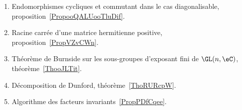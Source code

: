 
	\label{THEMEooPolynomeEndomorphismes}
\begin{enumerate}
	\item Endomorphismes cycliques et commutant dans le cas diagonalisable, proposition~\ref{PropooQALUooTluDif}.
	\item Racine carrée d'une matrice hermitienne positive, proposition~\ref{PropVZvCWn}.
	\item Théorème de Burnside sur les sous-groupes d'exposant fini de \( \GL(n,\eC)\), théorème~\ref{ThooJLTit}.
	\item Décomposition de Dunford, théorème~\ref{ThoRURcpW}.
	\item Algorithme des facteurs invariants~\ref{PropPDfCqee}.
\end{enumerate}

